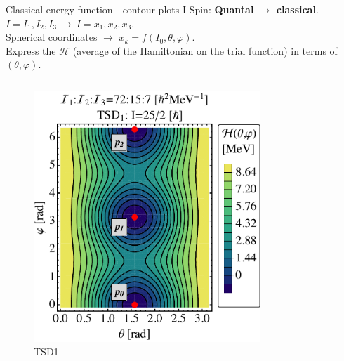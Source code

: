 \documentclass{beamer}
\begin{document}
\begin{frame}{Classical energy function - contour plots I}
Spin: \textbf{Quantal $\to$ classical}. $I=I_1,I_2,I_3\ \to\ I=x_1,x_2,x_3$. \\
Spherical coordinates $\to$ $x_k=f(I_0,\theta,\varphi)$.\\
Express the $\mathcal{H}$ (average of the Hamiltonian on the trial function) in terms of $(\theta,\varphi)$.
    \begin{columns} 
\begin{figure}
    \centering
    \includegraphics[scale=0.3]{figs/contour1_optimal.pdf}
    \caption{TSD1}
\end{figure}
\begin{figure}
    \centering

\end{figure}
\end{columns}
\end{frame}
\end{document}
